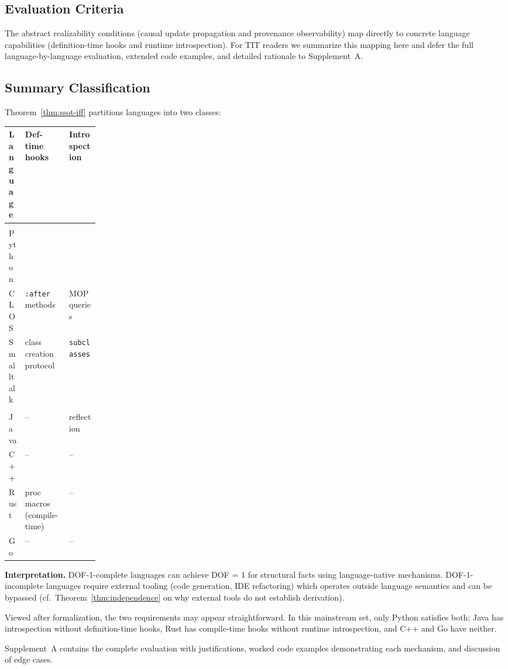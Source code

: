 \subsection{Evaluation Criteria}\label{sec:criteria}

The abstract realizability conditions (causal update propagation and provenance observability) map directly to concrete language capabilities (definition-time hooks and runtime introspection). For TIT readers we summarize this mapping here and defer the full language-by-language evaluation, extended code examples, and detailed rationale to Supplement~A.

\subsection{Summary Classification}\label{sec:classification-summary}

Theorem~\ref{thm:ssot-iff} partitions languages into two classes:

\begin{center}
\small
\setlength{\tabcolsep}{3pt}
\begin{tabularx}{\linewidth}{@{}>{\RaggedRight\arraybackslash}p{0.18\linewidth}YY@{}}
\toprule
\textbf{Language} & \textbf{Def-time hooks} & \textbf{Introspection} \\
\midrule
{} \\
Python &  &  \\
CLOS & \texttt{:after} methods & MOP queries \\
Smalltalk & class creation protocol & \texttt{subclasses} \\
\midrule
{} \\
Java & -- & reflection \\
C++ & -- & -- \\
Rust & proc macros (compile-time) & -- \\
Go & -- & -- \\
\bottomrule
\end{tabularx}
\end{center}

\textbf{Interpretation.} DOF-1-complete languages can achieve DOF = 1 for structural facts using language-native mechanisms. DOF-1-incomplete languages require external tooling (code generation, IDE refactoring) which operates outside language semantics and can be bypassed (cf.\ Theorem~\ref{thm:independence} on why external tools do not establish derivation).

Viewed after formalization, the two requirements may appear straightforward. In this mainstream set, only Python satisfies both; Java has introspection without definition-time hooks, Rust has compile-time hooks without runtime introspection, and C++ and Go have neither.

Supplement~A contains the complete evaluation with justifications, worked code examples demonstrating each mechanism, and discussion of edge cases.
